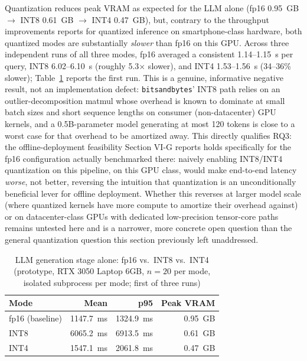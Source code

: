 \documentclass[conference]{IEEEtran}
\begin{document}
Quantization reduces peak VRAM as expected for the LLM alone (fp16 0.95~GB $\to$ INT8 0.61~GB $\to$ INT4 0.47~GB), but, contrary to the throughput improvements \cite{compactllm2026} reports for quantized inference on smartphone-class hardware, both quantized modes are substantially \emph{slower} than fp16 on this GPU. Across three independent runs of all three modes, fp16 averaged a consistent 1.14--1.15~s per query, INT8 6.02--6.10~s (roughly 5.3$\times$ slower), and INT4 1.53--1.56~s (34--36\% slower); Table~\ref{tab:quant} reports the first run. This is a genuine, informative negative result, not an implementation defect: \texttt{bitsandbytes}' INT8 path relies on an outlier-decomposition matmul whose overhead is known to dominate at small batch sizes and short sequence lengths on consumer (non-datacenter) GPU kernels, and a 0.5B-parameter model generating at most 120 tokens is close to a worst case for that overhead to be amortized away. This directly qualifies RQ3: the offline-deployment feasibility Section VI-G reports holds specifically for the fp16 configuration actually benchmarked there: naively enabling INT8/INT4 quantization on this pipeline, on this GPU class, would make end-to-end latency \emph{worse}, not better, reversing the intuition that quantization is an unconditionally beneficial lever for offline deployment. Whether this reverses at larger model scale (where quantized kernels have more compute to amortize their overhead against) or on datacenter-class GPUs with dedicated low-precision tensor-core paths remains untested here and is a narrower, more concrete open question than the general quantization question this section previously left unaddressed.

\begin{table}[t]
\caption{LLM generation stage alone: fp16 vs.\ INT8 vs.\ INT4 (prototype, RTX 3050 Laptop 6GB, $n{=}20$ per mode, isolated subprocess per mode; first of three runs)}
\begin{center}
\begin{tabular}{@{}lrrr@{}}
\toprule
\textbf{Mode} & \textbf{Mean} & \textbf{p95} & \textbf{Peak VRAM} \\
\midrule
fp16 (baseline) & 1147.7~ms & 1324.9~ms & 0.95~GB \\
INT8            & 6065.2~ms & 6913.5~ms & 0.61~GB \\
INT4            & 1547.1~ms & 2061.8~ms & 0.47~GB \\
\bottomrule
\end{tabular}
\end{center}
\label{tab:quant}
\end{table}
\end{document}
